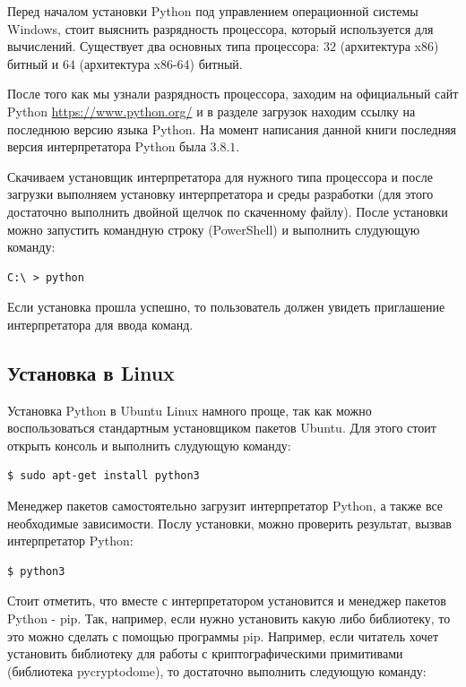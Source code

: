 Перед началом установки Python под управлением операционной системы
Windows, стоит выяснить разрядность процессора, который используется
для вычислений. Существует два основных типа процессора: $32$ (архитектура 
x86) битный и $64$ (архитектура x86-64) битный.

После того как мы узнали разрядность процессора, заходим на официальный 
сайт Python \url{https://www.python.org/} и в разделе загрузок 
находим ссылку на последнюю версию языка Python. На момент написания 
данной книги последняя версия интерпретатора Python была $3.8.1$.

Скачиваем установщик интерпретатора для нужного типа процессора и после 
загрузки выполняем установку интерпретатора и среды разработки (для этого 
достаточно выполнить двойной щелчок по скаченному файлу). После установки
можно запустить командную строку (PowerShell) и выполнить слудующую команду:

\begin{verbatim}
C:\ > python
\end{verbatim}

Если установка прошла успешно, то пользователь должен увидеть приглашение 
интерпретатора для ввода команд.

\subsection{Установка в Linux}

Установка Python в Ubuntu Linux намного проще, так как можно воспользоваться
стандартным установщиком пакетов Ubuntu. Для этого стоит открыть консоль
и выполнить слудующую команду:

\begin{verbatim}
$ sudo apt-get install python3
\end{verbatim}

Менеджер пакетов самостоятельно загрузит интерпретатор Python, а также
все необходимые зависимости. Послу установки, можно проверить результат,
вызвав интерпретатор Python:

\begin{verbatim}
$ python3
\end{verbatim}

Стоит отметить, что вместе с интерпретатором установится и менеджер пакетов Python
- pip. Так, например, если нужно установить какую либо библиотеку, то это можно 
сделать с помощью программы pip. Например, если читатель хочет установить библиотеку
для работы с криптографическими примитивами (библиотека pycryptodome), то достаточно 
выполнить следующую команду:

